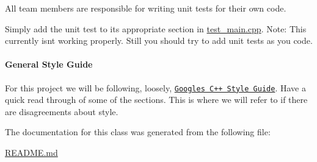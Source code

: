 \begin{DoxyItemize}
\item All team members are responsible for writing unit tests for their own code.
\item Simply add the unit test to its appropriate section in \hyperlink{test__main_8cpp}{test\+\_\+main.\+cpp}. Note\+: This currently isn\textquotesingle{}t working properly. Still you should try to add unit tests as you code.
\end{DoxyItemize}

\paragraph*{General Style Guide}


\begin{DoxyItemize}
\item For this project we will be following, loosely, \href{https://google.github.io/styleguide/cppguide.html}{\tt Google\textquotesingle{}s C++ Style Guide}. Have a quick read through of some of the sections. This is where we will refer to if there are disagreements about style. 
\end{DoxyItemize}

The documentation for this class was generated from the following file\+:\begin{DoxyCompactItemize}
\item 
\hyperlink{_r_e_a_d_m_e_8md}{R\+E\+A\+D\+M\+E.\+md}\end{DoxyCompactItemize}
